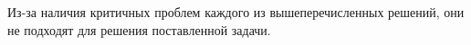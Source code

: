 Из-за наличия критичных проблем каждого из вышеперечисленных решений,
они не подходят для решения поставленной задачи.






